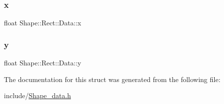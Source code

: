 \mbox{\label{struct_shape_1_1_rect_1_1_data_a84ab13209189e585eba6aaa128aa9c04}} 
\subsubsection{\texorpdfstring{x}{x}}
{\footnotesize\ttfamily float Shape\+::\+Rect\+::\+Data\+::x}

\mbox{\label{struct_shape_1_1_rect_1_1_data_a5b9133d085626c33eb11f6da8b6bc24c}} 
\subsubsection{\texorpdfstring{y}{y}}
{\footnotesize\ttfamily float Shape\+::\+Rect\+::\+Data\+::y}



The documentation for this struct was generated from the following file\+:\begin{DoxyCompactItemize}
\item 
include/\mbox{\hyperlink{_shape__data_8h}{Shape\+\_\+data.\+h}}\end{DoxyCompactItemize}
